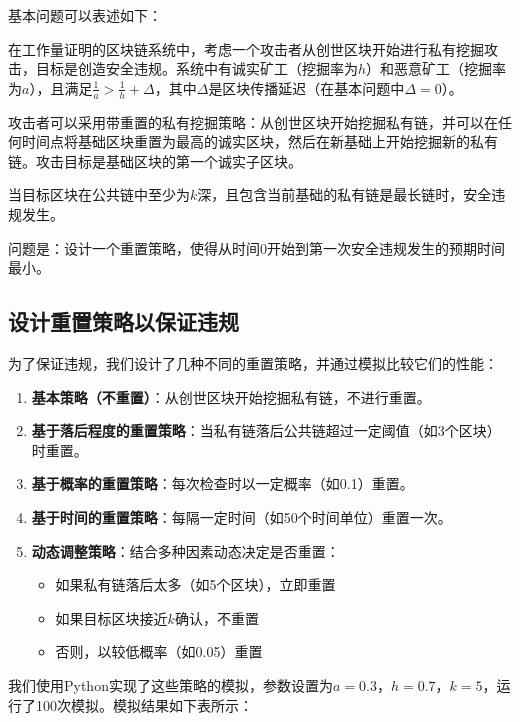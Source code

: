 \documentclass[12pt,a4paper]{article}
\begin{document}
\begin{CJK}{UTF8}{gbsn}
基本问题可以表述如下：

在工作量证明的区块链系统中，考虑一个攻击者从创世区块开始进行私有挖掘攻击，目标是创造安全违规。系统中有诚实矿工（挖掘率为$h$）和恶意矿工（挖掘率为$a$），且满足$\frac{1}{a} > \frac{1}{h} + \Delta$，其中$\Delta$是区块传播延迟（在基本问题中$\Delta = 0$）。

攻击者可以采用带重置的私有挖掘策略：从创世区块开始挖掘私有链，并可以在任何时间点将基础区块重置为最高的诚实区块，然后在新基础上开始挖掘新的私有链。攻击目标是基础区块的第一个诚实子区块。

当目标区块在公共链中至少为$k$深，且包含当前基础的私有链是最长链时，安全违规发生。

问题是：设计一个重置策略，使得从时间0开始到第一次安全违规发生的预期时间最小。

\subsection{设计重置策略以保证违规}

为了保证违规，我们设计了几种不同的重置策略，并通过模拟比较它们的性能：

\begin{enumerate}
    \item \textbf{基本策略（不重置）}：从创世区块开始挖掘私有链，不进行重置。
    \item \textbf{基于落后程度的重置策略}：当私有链落后公共链超过一定阈值（如3个区块）时重置。
    \item \textbf{基于概率的重置策略}：每次检查时以一定概率（如0.1）重置。
    \item \textbf{基于时间的重置策略}：每隔一定时间（如50个时间单位）重置一次。
    \item \textbf{动态调整策略}：结合多种因素动态决定是否重置：
        \begin{itemize}
            \item 如果私有链落后太多（如5个区块），立即重置
            \item 如果目标区块接近$k$确认，不重置
            \item 否则，以较低概率（如0.05）重置
        \end{itemize}
\end{enumerate}

我们使用Python实现了这些策略的模拟，参数设置为$a = 0.3$，$h = 0.7$，$k = 5$，运行了100次模拟。模拟结果如下表所示：


\end{CJK}
\end{document}
